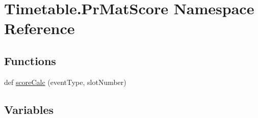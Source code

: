 \hypertarget{namespaceTimetable_1_1PrMatScore}{}\section{Timetable.\+Pr\+Mat\+Score Namespace Reference}
\label{namespaceTimetable_1_1PrMatScore}
\subsection*{Functions}
\begin{DoxyCompactItemize}
\item 
def \hyperlink{namespaceTimetable_1_1PrMatScore_a865ecd0bbe766a40daec9bd38ec79c3a}{score\+Calc} (event\+Type, slot\+Number)
\end{DoxyCompactItemize}
\subsection*{Variables}
